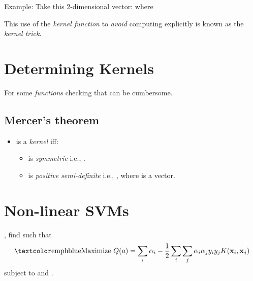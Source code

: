 \documentclass[
	number={2},
	title={Learning Linear Separators{,} SVMs and Kernels}
]{cs584notes}
\begin{document}
Example: Take this 2-dimensional vector: 
where 

This use of the \emph{kernel function} to \emph{avoid} computing  explicitly is known as the \emph{kernel trick}.

\section{Determining Kernels}\label{sec:determining-kernels}
For some \emph{functions}  checking that  can be cumbersome.\\

\subsection{Mercer's theorem}\label{subsec:mercers-theorem}
\begin{itemize}
	\item {} is a \emph{kernel} iff:
	\begin{itemize}
		\item {} is \emph{symmetric} i.e., .
		\item {} is \emph{positive semi-definite} i.e., , where  is a vector.
	\end{itemize}
\end{itemize}

\section{Non-linear SVMs}\label{sec:non-linear-svms}
\begin{svmbox}
	, find  such that
	\[ \mbox{\emph{Maximize} } Q(a) = \sum_{i}\alpha_{i} - \frac{1}{2} \sum_{i} \sum_{j} \alpha_{i} \alpha_{j} y_{i} y_{j} K(\vec{x}_{i}, \vec{x}_{j}) \]
	subject to  and .
\end{svmbox}
\end{document}
